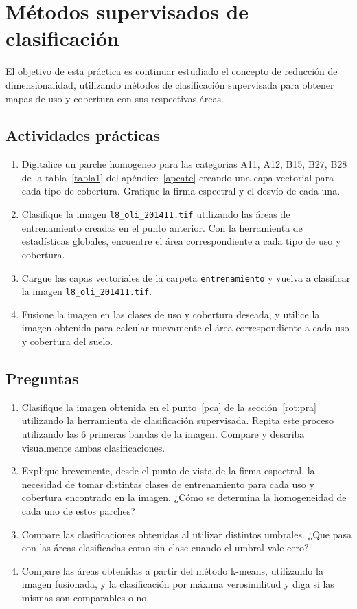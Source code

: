 \documentclass[hidelinks,12pt]{article}
\begin{document}
\newpage
\section{Métodos supervisados de clasificación}
El objetivo de esta práctica es continuar estudiado el concepto de reducción de 
dimensionalidad, utilizando métodos de clasificación supervisada para obtener 
mapas de uso y cobertura con sus respectivas áreas. 

\subsection{Actividades pr\'acticas}
\begin{enumerate}
    \item Digitalice un parche homogeneo  para las categorias A11, A12, B15, B27, B28 de la 
    tabla~\ref{tabla1} del ap\'endice~\ref{apcate} creando una capa vectorial para 
    cada tipo de cobertura. Grafique la firma espectral y el desvío de cada una. 
    \item Clasifique la imagen \texttt{l8\_oli\_2014\-11.tif} utilizando las
    áreas de entrenamiento creadas en el punto anterior. Con la herramienta
    de estadísticas globales, encuentre el área correspondiente a cada tipo de uso y
    cobertura.
    \item Cargue las capas vectoriales de la carpeta \texttt{entrenamiento} y
        vuelva a clasificar la imagen \texttt{l8\_oli\_2014\-11.tif}.
    \item Fusione la imagen en las clases de uso y cobertura deseada, y utilice la
    imagen obtenida para calcular nuevamente el área correspondiente a cada uso y
    cobertura del suelo. 
\end{enumerate}

\subsection{Preguntas}
\begin{enumerate}
    \item Clasifique la imagen obtenida en el punto~\ref{pca} de la secci\'on~\ref{rot:pra}
        utilizando la herramienta de clasificación supervisada.
        Repita este proceso utilizando las 6 primeras bandas de la imagen. 
        Compare y describa visualmente ambas clasificaciones.
    \item Explique brevemente, desde el punto de vista de la firma espectral, la
        necesidad de tomar distintas clases de entrenamiento para cada uso y
        cobertura encontrado en la imagen. ¿Cómo se determina la homogeneidad de
        cada uno de estos parches?
    \item Compare las clasificaciones obtenidas al utilizar distintos umbrales. 
        ¿Que pasa con las \'areas clasificadas como sin clase cuando el umbral
        vale cero?
    \item Compare las áreas obtenidas a partir del método k-means, utilizando la
        imagen fusionada, y la clasificación por máxima verosimilitud y diga si
        las mismas son comparables o no.
\end{enumerate}
\end{document}
